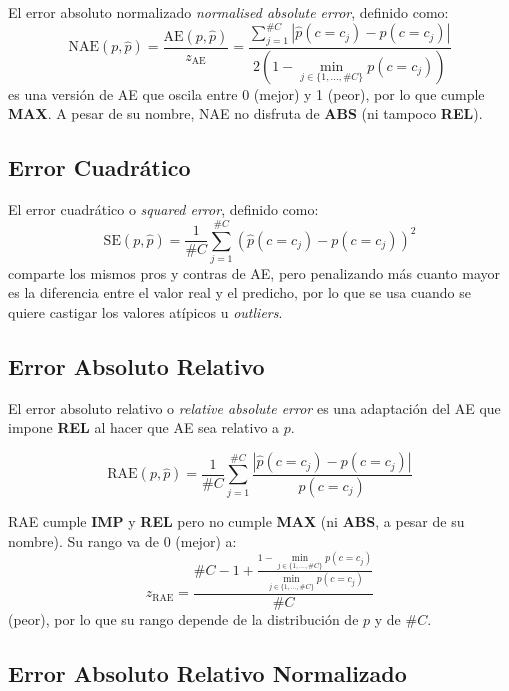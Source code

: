 El error absoluto normalizado {\it normalised absolute error}, definido como:
\begin{equation}
    {\text{NAE}(p, \hat p)} = \frac{\text{AE}(p, \hat p)}{z_{\text{AE}}} = \frac{\sum \limits_{j=1}^{\#C}{|\hat p(c=c_j) - p(c=c_j)|}}{2(1-\displaystyle \min_{j\in\{1,\dots,\#C\}}p(c=c_j))}
\end{equation}
es una versión de AE que oscila entre 0 (mejor) y 1 (peor), por lo que cumple
{\bf MAX}. A pesar de su nombre, NAE no disfruta de {\bf ABS} (ni tampoco {\bf
REL}).

\subsection{Error Cuadrático}

El error cuadrático o {\it squared error}, definido como:
\begin{equation}
    {\text{SE}(p, \hat p)} = \frac{1}{\#C}\sum \limits_{j=1}^{\#C}{{(\hat p(c=c_j) - p(c=c_j))}^2}
\end{equation}
comparte los mismos pros y contras de AE, pero penalizando más cuanto mayor es
la diferencia entre el valor real y el predicho, por lo que se usa cuando se
quiere castigar los valores atípicos u {\it outliers}.

\subsection{Error Absoluto Relativo}

El error absoluto relativo o {\it relative absolute error\/} es una adaptación
del AE que impone {\bf REL} al hacer que AE sea relativo a $p$.

\begin{equation}
    {\text{RAE}(p, \hat p)} = \frac{1}{\#C}\sum \limits_{j=1}^{\#C}{\frac{|\hat p(c=c_j) - p(c=c_j)|}{p(c=c_j)}}
\end{equation}

RAE cumple {\bf IMP} y {\bf REL} pero no cumple {\bf MAX} (ni {\bf ABS}, a pesar
de su nombre). Su rango va de 0 (mejor) a:
\begin{equation}
    z_{\text{RAE}} = \frac{\#C - 1 + \frac {1 - \displaystyle \min_{j\in\{1,\dots,\#C\}}p(c=c_j)}{\displaystyle \min_{j\in\{1,\dots,\#C\}}p(c=c_j)}}{\#C}
\end{equation}
(peor), por lo que su rango depende de la distribución de $p$ y de $\#C$.

\subsection{Error Absoluto Relativo Normalizado}

